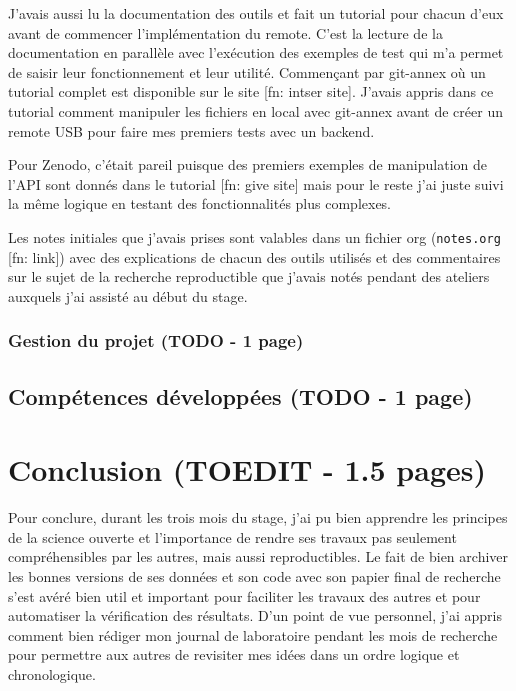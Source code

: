 \documentclass[11pt]{article}
\begin{document}
J'avais aussi lu la documentation des outils et fait un tutorial pour
chacun d'eux avant de commencer l'implémentation du remote. C'est la
lecture de la documentation en parallèle avec l'exécution des exemples
de test qui m'a permet de saisir leur fonctionnement et leur utilité.
Commençant par git-annex où un tutorial complet est disponible sur le
site [fn: intser site]. J'avais appris dans ce tutorial comment
manipuler les fichiers en local avec git-annex avant de créer un
remote USB pour faire mes premiers tests avec un backend.

Pour Zenodo, c'était pareil puisque des premiers exemples de
manipulation de l'API sont donnés dans le tutorial [fn: give site]
mais pour le reste j'ai juste suivi la même logique en testant des
fonctionnalités plus complexes.

Les notes initiales que j'avais prises sont valables dans un fichier
org (\texttt{notes.org} [fn: link]) avec des explications de chacun des outils utilisés et des
commentaires sur le sujet de la recherche reproductible que j'avais
notés pendant des ateliers auxquels j'ai assisté au début du stage. 

\subsubsection{Gestion du projet (TODO - 1 page)}
\label{sec:org60cd00a}

\subsection{Compétences développées (TODO - 1 page)}
\label{sec:org9bc9bd1}

\section{Conclusion (TOEDIT - 1.5 pages)}
\label{sec:org287fb75}
Pour conclure, durant les trois mois du stage, j'ai pu bien apprendre
les principes de la science ouverte et l'importance de
rendre ses travaux pas seulement compréhensibles par les autres, mais
aussi reproductibles. Le fait de bien archiver les bonnes versions de
ses données et son code avec son papier final de recherche s'est avéré
bien util et important pour faciliter les travaux des autres et pour
automatiser la vérification des résultats. D'un point de vue personnel,
j'ai appris comment bien rédiger mon journal de laboratoire pendant
les mois de recherche pour permettre aux autres de revisiter mes idées
dans un ordre logique et chronologique.
\end{document}
